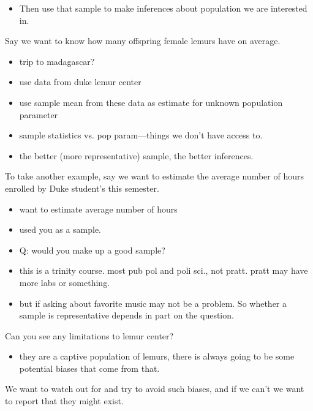 \documentclass[slidestop,compress,mathserif,12pt,t,professionalfonts,xcolor=table]{beamer}
\begin{document}
\begin{frame}
{\begin{itemize}
\item Then use that sample to make inferences about population we are interested in.

\end{itemize}

Say we want to know how many offspring female lemurs have on average.
\begin{itemize}

\item trip to madagascar?

\item use data from duke lemur center

\item use sample mean from these data as estimate for unknown population parameter

\item sample statistics vs. pop param---things we don't have access to.

\item the better (more representative) sample, the better inferences.

\end{itemize}

To take another example, say we want to estimate the average number of hours enrolled by Duke student's this semester.
\begin{itemize}

\item want to estimate average number of hours

\item used you as a sample.

\item Q: would you make up a good sample?

\item  this is a trinity course.  most pub pol and poli sci., not pratt.
pratt may have more labs or something.

\item but if asking about favorite music may not be a problem.  So whether a sample is representative depends in part on the question.

\end{itemize}

Can you see any limitations to lemur center?
\begin{itemize}
\item they are a captive population of lemurs, there is always going to be some
potential biases that come from that.
\end{itemize}

We want to watch out for and try to avoid such biases, and if we can't we want to report that they might exist.

}

\end{frame}
\end{document}
